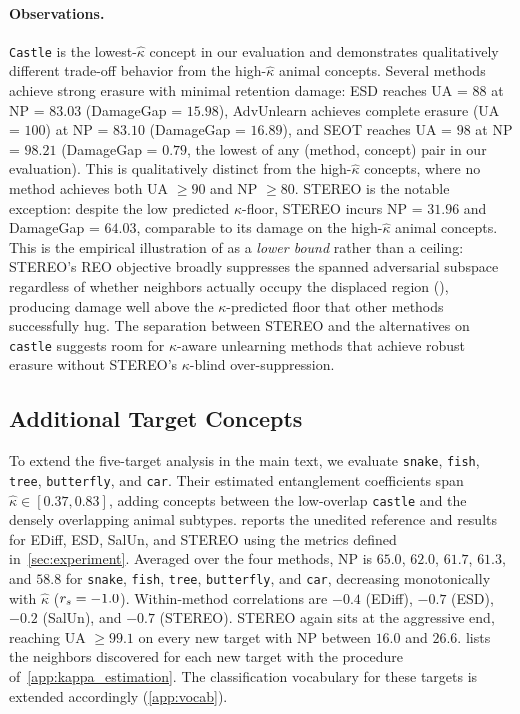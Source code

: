 \paragraph{Observations.}
\texttt{Castle} is the lowest-$\hat\kappa$ concept in our evaluation and demonstrates qualitatively different trade-off behavior from the high-$\hat\kappa$ animal concepts. Several methods achieve strong erasure with minimal retention damage: ESD reaches UA = $88$ at NP = $83.03$ (DamageGap = $15.98$), AdvUnlearn achieves complete erasure (UA = $100$) at NP = $83.10$ (DamageGap = $16.89$), and SEOT reaches UA = $98$ at NP = $98.21$ (DamageGap = $0.79$, the lowest of any (method, concept) pair in our evaluation). This is qualitatively distinct from the high-$\hat\kappa$ concepts, where no method achieves both UA $\geq 90$ and NP $\geq 80$. STEREO is the notable exception: despite the low predicted $\kappa$-floor, STEREO incurs NP = $31.96$ and DamageGap = $64.03$, comparable to its damage on the high-$\hat\kappa$ animal concepts. This is the empirical illustration of  as a \emph{lower bound} rather than a ceiling: STEREO's REO objective broadly suppresses the spanned adversarial subspace regardless of whether neighbors actually occupy the displaced region (), producing damage well above the $\kappa$-predicted floor that other methods successfully hug. The separation between STEREO and the alternatives on \texttt{castle} suggests room for $\kappa$-aware unlearning methods that achieve robust erasure without STEREO's $\kappa$-blind over-suppression.

\subsection{Additional Target Concepts}
\label{app:additional_concepts}
To extend the five-target analysis in the main text, we evaluate \texttt{snake}, \texttt{fish}, \texttt{tree}, \texttt{butterfly}, and \texttt{car}. Their estimated entanglement coefficients span $\hat\kappa \in [0.37, 0.83]$, adding concepts between the low-overlap \texttt{castle} and the densely overlapping animal subtypes.  reports the unedited reference and results for EDiff, ESD, SalUn, and STEREO using the metrics defined in~\cref{sec:experiment}.
Averaged over the four methods, NP is $65.0$, $62.0$, $61.7$, $61.3$, and $58.8$ for \texttt{snake}, \texttt{fish}, \texttt{tree}, \texttt{butterfly}, and \texttt{car}, decreasing monotonically with $\hat\kappa$ ($r_s=-1.0$). Within-method correlations are $-0.4$ (EDiff), $-0.7$ (ESD), $-0.2$ (SalUn), and $-0.7$ (STEREO). STEREO again sits at the aggressive end, reaching UA $\geq 99.1$ on every new target with NP between $16.0$ and $26.6$.
 lists the neighbors discovered for each new target with the procedure of~\cref{app:kappa_estimation}. The classification vocabulary for these targets is extended accordingly (\cref{app:vocab}).

